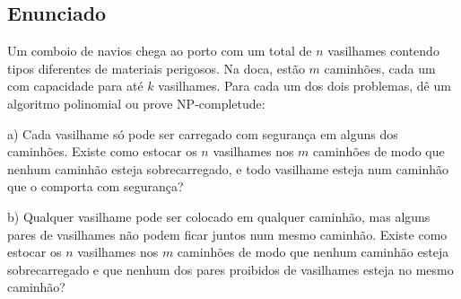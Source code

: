 \documentclass[11pt]{article}
\begin{document}
\subsection{Enunciado}
\label{sec-5-1}

Um comboio de navios chega ao porto com um total de $n$ vasilhames
contendo tipos diferentes de materiais perigosos.
Na doca, estão $m$ caminhões, cada um com capacidade para até $k$
vasilhames.  Para cada um dos dois problemas, dê um algoritmo
polinomial ou prove NP-completude:


a) Cada vasilhame só pode ser carregado com segurança em alguns
   dos caminhões. Existe como estocar os $n$ vasilhames nos $m$
   caminhões de modo que nenhum caminhão esteja sobrecarregado, e
   todo vasilhame esteja num caminhão que o comporta com segurança?


b) Qualquer vasilhame pode ser colocado em qualquer caminhão,
   mas alguns pares de vasilhames não podem ficar juntos num mesmo
   caminhão. Existe como estocar os $n$ vasilhames nos $m$
   caminhões de modo que nenhum caminhão esteja sobrecarregado e
   que nenhum dos pares proibidos de vasilhames esteja no mesmo
   caminhão?
\end{document}
